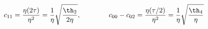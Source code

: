 \begin{equation}
  c_{11} = {\eta(2\tau)\over\eta^2}
  ={1\over\eta}{\sqrt{{\th_2\over 2\eta}}} , \qquad \qquad
  c_{00} -c_{02} = {\eta(\tau/2) \over\eta^2} =
  {1\over\eta}{\sqrt{{\th_4\over \eta}}} 
\end{equation}

